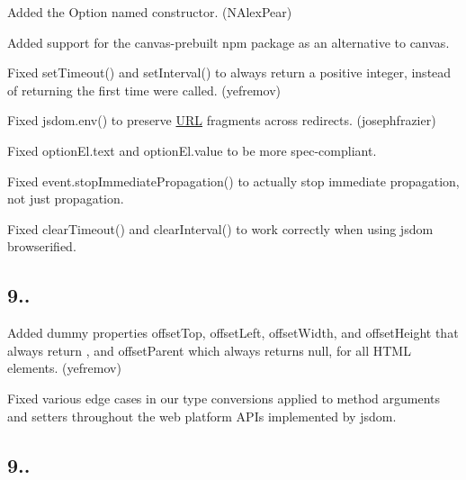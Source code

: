
\begin{DoxyItemize}
\item Added the {\ttfamily Option} named constructor. (N\+Alex\+Pear)
\item Added support for the {\ttfamily canvas-\/prebuilt} npm package as an alternative to {\ttfamily canvas}.
\item Fixed {\ttfamily set\+Timeout()} and {\ttfamily set\+Interval()} to always return a positive integer, instead of returning {} the first time were called. (yefremov)
\item Fixed {\ttfamily jsdom.\+env()} to preserve \mbox{\hyperlink{namespace_u_r_l}{U\+RL}} fragments across redirects. (josephfrazier)
\item Fixed {\ttfamily option\+El.\+text} and {\ttfamily option\+El.\+value} to be more spec-\/compliant.
\item Fixed {\ttfamily event.\+stop\+Immediate\+Propagation()} to actually stop immediate propagation, not just propagation.
\item Fixed {\ttfamily clear\+Timeout()} and {\ttfamily clear\+Interval()} to work correctly when using jsdom browserified.
\end{DoxyItemize}

\subsection*{9..}


\begin{DoxyItemize}
\item Added dummy properties {\ttfamily offset\+Top}, {\ttfamily offset\+Left}, {\ttfamily offset\+Width}, and {\ttfamily offset\+Height} that always return {}, and {\ttfamily offset\+Parent} which always returns {\ttfamily null}, for all H\+T\+ML elements. (yefremov)
\item Fixed various edge cases in our type conversions applied to method arguments and setters throughout the web platform A\+P\+Is implemented by jsdom.
\end{DoxyItemize}

\subsection*{9..}


